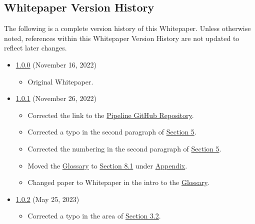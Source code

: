\documentclass[class=article, crop=false]{standalone}
\begin{document}
\subsection{Whitepaper Version History}
The following is a complete version history of this Whitepaper. Unless otherwise noted, references within this Whitepaper Version History are not updated to reflect later changes.

\begin{itemize}[topsep=0pt, itemsep=3pt,leftmargin=16pt]
    \item \href{https://github.com/BeanstalkFarms/Pipeline-Whitepaper/blob/master/version-history/pipeline1_0_0.pdf}{1.0.0} (November 16, 2022)
    \begin{itemize}
        \item Original Whitepaper.
    \end{itemize}
    \item \href{https://github.com/BeanstalkFarms/Pipeline-Whitepaper/blob/master/version-history/pipeline1_0_1.pdf}{1.0.1} (November 26, 2022)
    \begin{itemize}
        \item Corrected the link to the \href{https://github.com/BeanstalkFarms/Pipeline}{Pipeline GitHub Repository}.
        \item Corrected a typo in the second paragraph of \hyperlink{section.5}{Section 5}.
        \item Corrected the numbering in the second paragraph of \hyperlink{section.5}{Section 5}.
        \item Moved the \hyperlink{subsection.8.1}{Glossary} to \hyperlink{subsection.8.1}{Section 8.1} under \hyperlink{section.8}{Appendix}.
        \item Changed paper to Whitepaper in the intro to the \hyperlink{subsection.8.1}{Glossary}.
    \end{itemize}
    \item \href{https://evmpipeline.org/pipeline.pdf}{1.0.2} (May 25, 2023)
    \begin{itemize}
        \item Corrected a typo in the  area of \hyperlink{subsection.3.2}{Section 3.2}.
    \end{itemize}
    
\end{itemize}
\end{document}
